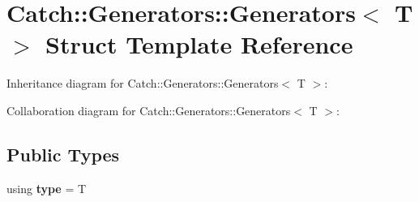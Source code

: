 \hypertarget{structCatch_1_1Generators_1_1Generators}{}\section{Catch\+:\+:Generators\+:\+:Generators$<$ T $>$ Struct Template Reference}
\label{structCatch_1_1Generators_1_1Generators}


Inheritance diagram for Catch\+:\+:Generators\+:\+:Generators$<$ T $>$\+:


Collaboration diagram for Catch\+:\+:Generators\+:\+:Generators$<$ T $>$\+:
\subsection*{Public Types}
\begin{DoxyCompactItemize}
\item 
using {\bfseries type} = T\hypertarget{structCatch_1_1Generators_1_1Generators_aab27f98a577b49532b2ca7556a84286b}{}\label{structCatch_1_1Generators_1_1Generators_aab27f98a577b49532b2ca7556a84286b}

\end{DoxyCompactItemize}
